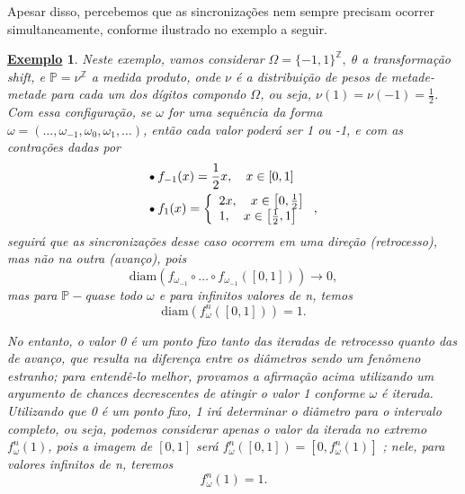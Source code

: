 \documentclass[12pt, a4paper]{article}
\newtheorem{example}{\underline{Exemplo}}
\theoremstyle{definition}
\begin{document}
Apesar disso, percebemos que as sincronizações nem sempre precisam ocorrer simultaneamente, conforme ilustrado no exemplo a seguir.
\begin{example}
	Neste exemplo, vamos considerar \(\Omega = \{-1, 1\}^{\mathbb{Z}},\; \theta \) a transformação \textit{shift}, e \(\mathbb{P}=\nu^{\mathbb{Z}}\) a medida produto, onde \(\nu \) é a distribuição de pesos de metade-metade para cada um dos dígitos compondo \(\Omega \), ou seja, \(\nu (1) =\nu (-1)=\frac{1}{2}\).
	Com essa configuração, se \(\omega \) for uma sequência da forma \(\omega = (\dotsc , \omega_{-1}, \omega_{0}, \omega_{1}, \dotsc )\), então cada valor poderá ser 1 ou -1, e com as contrações dadas por
	\begin{align*}
		 & \tikz[baseline=-0.5ex]\draw[black, fill=black, radius=1.5pt](0, 0)circle; \; f_{-1}(x)=\frac{1}{2}x, \quad x\in [0,1]                               \\
		 & \tikz[baseline=-0.5ex]\draw[black, fill=black, radius=1.5pt](0, 0)circle; \; f_{1}(x) = \left\{\begin{array}{ll}
			                                                                                                  2x, \quad x\in \bigl[0, \frac{1}{2}\bigr] \\
			                                                                                                  1, \quad x\in \bigl[\frac{1}{2}, 1\bigr]
		                                                                                                  \end{array}\right.,
	\end{align*}
	seguirá que as sincronizações desse caso ocorrem em uma direção (retrocesso), mas não na outra (avanço), pois
	\[
		\mathrm{diam}(f_{\omega_{-1}}\circ \dotsc \circ f_{\omega_{-1}}([0, 1])) \rightarrow 0,
	\]
	mas para \(\mathbb{P}-\)quase todo \(\omega \) e para infinitos valores de n, temos
	\[
		\mathrm{diam}(f_{\omega }^{n}([0,1]))=1.
	\]

	No entanto, o valor 0 é um ponto fixo tanto das iteradas de retrocesso quanto das de avanço, que resulta na diferença entre os diâmetros sendo um fenômeno estranho; para entendê-lo melhor, provamos a afirmação acima utilizando um argumento de chances decrescentes de atingir o valor 1 conforme \(\omega \) é iterada.
	Utilizando que 0 é um ponto fixo, 1 irá determinar o diâmetro para o intervalo completo, ou seja, podemos considerar apenas o valor da iterada no extremo \(f_{\omega }^{n}(1)\), pois a imagem de \([0, 1]\) será \(f_{\omega }^{n}([0,1]) = [0, f_{\omega }^{n}(1)]\) ; nele, para valores infinitos de n, teremos
	\[
		f_{\omega }^{n}(1) = 1.
	\]


\end{example}
\end{document}

